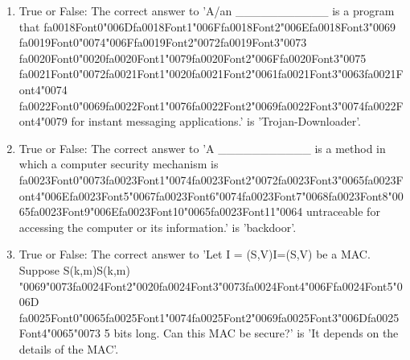 \documentclass[12pt]{article}
\begin{document}
\begin{enumerate}[label=\arabic*.]
\item True or False: The correct answer to 'A/an \_\_\_\_\_\_\_\_\_\_\_ is a program that {\csname fa0018Font0\endcsname\char"006D}{\csname fa0018Font1\endcsname\char"006F}{\csname fa0018Font2\endcsname\char"006E}{\csname fa0018Font3\endcsname\char"0069} {\csname fa0019Font0\endcsname\char"0074}{\char"006F}{\csname fa0019Font2\endcsname\char"0072}{\csname fa0019Font3\endcsname\char"0073} {\csname fa0020Font0\endcsname\char"0020}{\csname fa0020Font1\endcsname\char"0079}{\csname fa0020Font2\endcsname\char"006F}{\csname fa0020Font3\endcsname\char"0075} {\csname fa0021Font0\endcsname\char"0072}{\csname fa0021Font1\endcsname\char"0020}{\csname fa0021Font2\endcsname\char"0061}{\csname fa0021Font3\endcsname\char"0063}{\csname fa0021Font4\endcsname\char"0074} {\csname fa0022Font0\endcsname\char"0069}{\csname fa0022Font1\endcsname\char"0076}{\csname fa0022Font2\endcsname\char"0069}{\csname fa0022Font3\endcsname\char"0074}{\csname fa0022Font4\endcsname\char"0079} for instant messaging applications.' is 'Trojan-Downloader'.
\item True or False: The correct answer to 'A \_\_\_\_\_\_\_\_\_\_\_ is a method in which a computer security mechanism is {\csname fa0023Font0\endcsname\char"0073}{\csname fa0023Font1\endcsname\char"0074}{\csname fa0023Font2\endcsname\char"0072}{\csname fa0023Font3\endcsname\char"0065}{\csname fa0023Font4\endcsname\char"006E}{\csname fa0023Font5\endcsname\char"0067}{\csname fa0023Font6\endcsname\char"0074}{\csname fa0023Font7\endcsname\char"0068}{\csname fa0023Font8\endcsname\char"0065}{\csname fa0023Font9\endcsname\char"006E}{\csname fa0023Font10\endcsname\char"0065}{\csname fa0023Font11\endcsname\char"0064} untraceable for accessing the computer or its information.' is 'backdoor'.
\item True or False: The correct answer to 'Let I = (S,V)I=(S,V) be a MAC. Suppose S(k,m)S(k,m) {\char"0069}{\char"0073}{\csname fa0024Font2\endcsname\char"0020}{\csname fa0024Font3\endcsname\char"0073}{\csname fa0024Font4\endcsname\char"006F}{\csname fa0024Font5\endcsname\char"006D} {\csname fa0025Font0\endcsname\char"0065}{\csname fa0025Font1\endcsname\char"0074}{\csname fa0025Font2\endcsname\char"0069}{\csname fa0025Font3\endcsname\char"006D}{\csname fa0025Font4\endcsname\char"0065}{\char"0073} 5 bits long. Can this MAC be secure?' is 'It depends on the details of the MAC'.
\end{enumerate}
\end{document}
